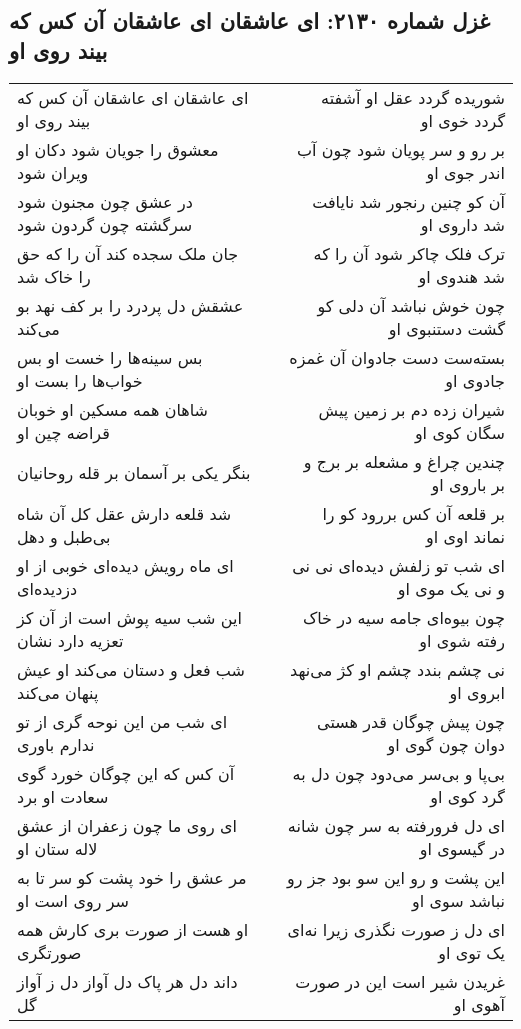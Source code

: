 \begin{center}
\section*{غزل شماره ۲۱۳۰: ای عاشقان ای عاشقان آن کس که بیند روی او}
\label{sec:2130}
\begin{longtable}{l p{0.5cm} r}
ای عاشقان ای عاشقان آن کس که بیند روی او
&&
شوریده گردد عقل او آشفته گردد خوی او
\\
معشوق را جویان شود دکان او ویران شود
&&
بر رو و سر پویان شود چون آب اندر جوی او
\\
در عشق چون مجنون شود سرگشته چون گردون شود
&&
آن کو چنین رنجور شد نایافت شد داروی او
\\
جان ملک سجده کند آن را که حق را خاک شد
&&
ترک فلک چاکر شود آن را که شد هندوی او
\\
عشقش دل پردرد را بر کف نهد بو می‌کند
&&
چون خوش نباشد آن دلی کو گشت دستنبوی او
\\
بس سینه‌ها را خست او بس خواب‌ها را بست او
&&
بسته‌ست دست جادوان آن غمزه جادوی او
\\
شاهان همه مسکین او خوبان قراضه چین او
&&
شیران زده دم بر زمین پیش سگان کوی او
\\
بنگر یکی بر آسمان بر قله روحانیان
&&
چندین چراغ و مشعله بر برج و بر باروی او
\\
شد قلعه دارش عقل کل آن شاه بی‌طبل و دهل
&&
بر قلعه آن کس بررود کو را نماند اوی او
\\
ای ماه رویش دیده‌ای خوبی از او دزدیده‌ای
&&
ای شب تو زلفش دیده‌ای نی نی و نی یک موی او
\\
این شب سیه پوش است از آن کز تعزیه دارد نشان
&&
چون بیوه‌ای جامه سیه در خاک رفته شوی او
\\
شب فعل و دستان می‌کند او عیش پنهان می‌کند
&&
نی چشم بندد چشم او کژ می‌نهد ابروی او
\\
ای شب من این نوحه گری از تو ندارم باوری
&&
چون پیش چوگان قدر هستی دوان چون گوی او
\\
آن کس که این چوگان خورد گوی سعادت او برد
&&
بی‌پا و بی‌سر می‌دود چون دل به گرد کوی او
\\
ای روی ما چون زعفران از عشق لاله ستان او
&&
ای دل فرورفته به سر چون شانه در گیسوی او
\\
مر عشق را خود پشت کو سر تا به سر روی است او
&&
این پشت و رو این سو بود جز رو نباشد سوی او
\\
او هست از صورت بری کارش همه صورتگری
&&
ای دل ز صورت نگذری زیرا نه‌ای یک توی او
\\
داند دل هر پاک دل آواز دل ز آواز گل
&&
غریدن شیر است این در صورت آهوی او

\end{longtable}
\end{center}
